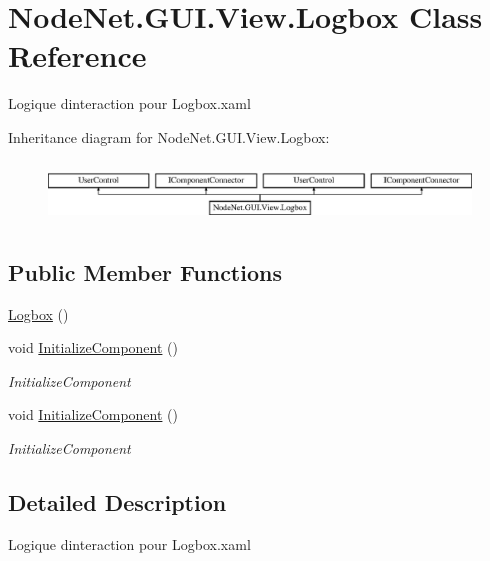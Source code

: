 \hypertarget{class_node_net_1_1_g_u_i_1_1_view_1_1_logbox}{}\section{Node\+Net.\+G\+U\+I.\+View.\+Logbox Class Reference}
\label{class_node_net_1_1_g_u_i_1_1_view_1_1_logbox}


Logique d\textquotesingle{}interaction pour Logbox.\+xaml  


Inheritance diagram for Node\+Net.\+G\+U\+I.\+View.\+Logbox\+:\begin{figure}[H]
\begin{center}
\leavevmode
\includegraphics[height=1.647059cm]{class_node_net_1_1_g_u_i_1_1_view_1_1_logbox}
\end{center}
\end{figure}
\subsection*{Public Member Functions}
\begin{DoxyCompactItemize}
\item 
\hyperlink{class_node_net_1_1_g_u_i_1_1_view_1_1_logbox_ab08546cc9268e1b9d4a67604d28858db}{Logbox} ()
\item 
void \hyperlink{class_node_net_1_1_g_u_i_1_1_view_1_1_logbox_aec0d90766cc946074cde168ef601963c}{Initialize\+Component} ()
\begin{DoxyCompactList}\small\item\em Initialize\+Component \end{DoxyCompactList}\item 
void \hyperlink{class_node_net_1_1_g_u_i_1_1_view_1_1_logbox_aec0d90766cc946074cde168ef601963c}{Initialize\+Component} ()
\begin{DoxyCompactList}\small\item\em Initialize\+Component \end{DoxyCompactList}\end{DoxyCompactItemize}


\subsection{Detailed Description}
Logique d\textquotesingle{}interaction pour Logbox.\+xaml 

